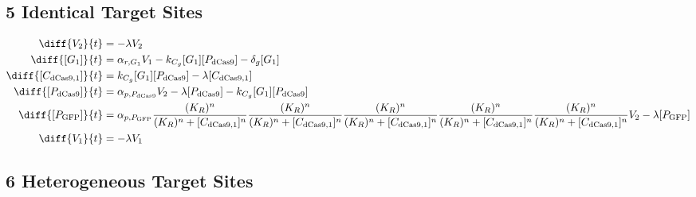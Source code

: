 \subsection{5 Identical Target Sites}
\label{s:Multisite_5_gRNA_Repression}

\begin{align}
\diff{\constructGen{2}}{t} & = - \dilutionRate{}\constructGen{2}\\
\diff{\conc{\gRna{1}}}{t} & =  \txRate{\gRna{1}}\constructGen{1} - \gRnaBind{}\conc{\gRna{1}}\conc{\proSp{\cas{}}} - \rnaDegradeRate{}\conc{\gRna{1}}\\
\diff{\conc{\cplx{\cas}{1}}}{t} & =  \gRnaBind{}\conc{\gRna{1}}\conc{\proSp{\cas{}}} - \dilutionRate{}\conc{\cplx{\cas}{1}}\\
\diff{\conc{\proSp{\cas{}}}}{t} & =  \txtlRate{\proSp{\cas{}}}\constructGen{2} - \dilutionRate{}\conc{\proSp{\cas{}}} - \gRnaBind{}\conc{\gRna{1}}\conc{\proSp{\cas{}}}\\
\diff{\conc{\proSp{\gfp}}}{t} & =  \txtlRate{\proSp{\gfp}}\frac{(K_R)^n}{(K_R)^n + \conc{\cplx{\cas}{1}}^n}\frac{(K_R)^n}{(K_R)^n + \conc{\cplx{\cas}{1}}^n}\frac{(K_R)^n}{(K_R)^n + \conc{\cplx{\cas}{1}}^n}\frac{(K_R)^n}{(K_R)^n + \conc{\cplx{\cas}{1}}^n}\frac{(K_R)^n}{(K_R)^n + \conc{\cplx{\cas}{1}}^n}\constructGen{2} - \dilutionRate{}\conc{\proSp{\gfp}}\\
\diff{\constructGen{1}}{t} & = - \dilutionRate{}\constructGen{1}
\end{align}

\subsection{6 Heterogeneous Target Sites}
\label{s:Multiplexed_6_gRNA_Repression}

